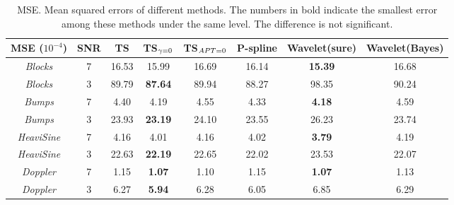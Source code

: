  \begin{table}
 	\centering
 	\caption{MSE. Mean squared errors of different methods. The numbers in bold indicate the smallest error among these methods under the same level. The difference is not significant.}\label{mse3200}
	\setlength\tabcolsep{1.5pt}
	\begin{tabular}{|c|c|c|c|c|c|c|c|}
\hline	MSE ($10^{-4}$)   & SNR & TS & TS$_{\footnotesize\gamma=0}$ & TS$_{\footnotesize APT=0}$  & P-spline & Wavelet(sure)& Wavelet(Bayes)\\ \hline
\textit{Blocks}    & 7   &  16.53& 15.99 & 16.69 & 16.14  & \textbf{15.39} & 16.68 \\ \hline
\textit{Blocks}    & 3   &  89.79 & \textbf{87.64} & 89.94  & 88.27 & 98.35 & 90.24 \\ \hline
\textit{Bumps}     & 7   & 4.40 & 4.19 & 4.55 & 4.33 & \textbf{4.18} & 4.59 \\ \hline
\textit{Bumps}     & 3   & 23.93 & \textbf{23.19} & 24.10 & 23.55 & 26.23 & 23.74 \\ \hline
\textit{HeaviSine} & 7   & 4.16 & 4.01 &4.16 & 4.02 & \textbf{3.79} & 4.19 \\ \hline
\textit{HeaviSine} & 3   & 22.63 & \textbf{22.19} & 22.65 & 22.02 & 23.53 & 22.07 \\ \hline
\textit{Doppler}   & 7   & 1.15 & \textbf{1.07} & 1.10 & 1.15  & \textbf{1.07} & 1.13  \\ \hline
\textit{Doppler}   & 3   & 6.27 & \textbf{5.94} &6.28 & 6.05  & 6.85 & 6.29  \\ \hline
	\end{tabular}
\end{table}


